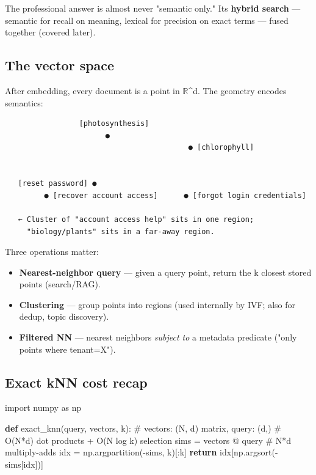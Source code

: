 \documentclass[11pt]{article}
\providecommand{\tightlist}{\setlength{\itemsep}{1pt}\setlength{\parskip}{0pt}}
\newenvironment{Shaded}{\begin{snugshade}}{\end{snugshade}}
\newcommand{\CommentTok}[1]{\textcolor[rgb]{0.48,0.49,0.49}{#1}}
\newcommand{\ControlFlowTok}[1]{\textcolor[rgb]{0.99,0.74,0.29}{\textbf{#1}}}
\newcommand{\ImportTok}[1]{\textcolor[rgb]{0.15,0.68,0.38}{#1}}
\newcommand{\KeywordTok}[1]{\textcolor[rgb]{0.81,0.81,0.76}{\textbf{#1}}}
\newcommand{\NormalTok}[1]{\textcolor[rgb]{0.81,0.81,0.76}{#1}}
\newcommand{\OperatorTok}[1]{\textcolor[rgb]{0.81,0.81,0.76}{#1}}
\begin{document}
The professional answer is almost never "semantic only." It\textquotesingle s \textbf{hybrid search} --- semantic for recall on meaning, lexical for precision on exact terms --- fused together (covered later).

\subsection{The vector space}\label{the-vector-space}

After embedding, every document is a point in \(\mathbb{R}\)\^{}d. The geometry encodes semantics:

\setcodelang{}

\begin{verbatim}
                 [photosynthesis]
                       ●
                                          ● [chlorophyll]


   [reset password] ●
         ● [recover account access]      ● [forgot login credentials]

   ← Cluster of "account access help" sits in one region;
     "biology/plants" sits in a far-away region.
\end{verbatim}

Three operations matter:

\begin{itemize}
\tightlist
\item
  \textbf{Nearest-neighbor query} --- given a query point, return the k closest stored points (search/RAG).
\item
  \textbf{Clustering} --- group points into regions (used internally by IVF; also for dedup, topic discovery).
\item
  \textbf{Filtered NN} --- nearest neighbors \emph{subject to} a metadata predicate ("only points where tenant=X").
\end{itemize}

\subsection{Exact kNN cost recap}\label{exact-knn-cost-recap}


\begin{Shaded}
\begin{Highlighting}[]
\ImportTok{import}\NormalTok{ numpy }\ImportTok{as}\NormalTok{ np}

\KeywordTok{def}\NormalTok{ exact\_knn(query, vectors, k):}
    \CommentTok{\# vectors: (N, d) matrix, query: (d,)}
    \CommentTok{\# O(N*d) dot products + O(N log k) selection}
\NormalTok{    sims }\OperatorTok{=}\NormalTok{ vectors }\OperatorTok{@}\NormalTok{ query           }\CommentTok{\# N*d multiply{-}adds}
\NormalTok{    idx }\OperatorTok{=}\NormalTok{ np.argpartition(}\OperatorTok{{-}}\NormalTok{sims, k)[:k]}
    \ControlFlowTok{return}\NormalTok{ idx[np.argsort(}\OperatorTok{{-}}\NormalTok{sims[idx])]}
\end{Highlighting}
\end{Shaded}
\end{document}
